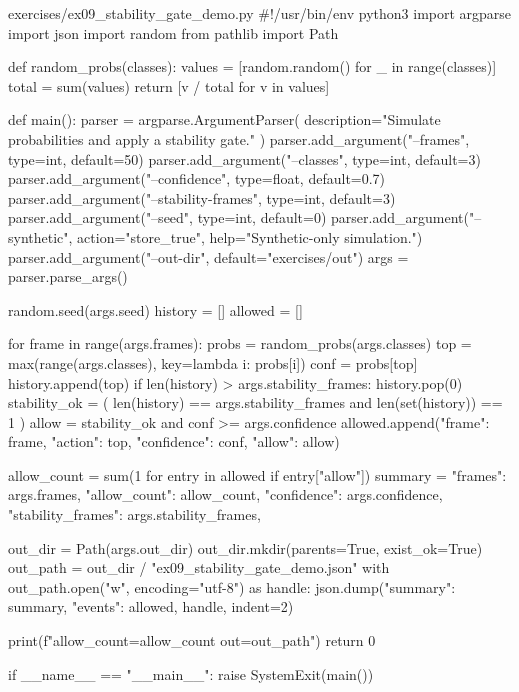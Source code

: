 \documentclass[11pt,openany]{book}
\begin{document}
\begin{filecontents*}{exercises/ex09_stability_gate_demo.py}
#!/usr/bin/env python3
import argparse
import json
import random
from pathlib import Path


def random_probs(classes):
    values = [random.random() for _ in range(classes)]
    total = sum(values)
    return [v / total for v in values]


def main():
    parser = argparse.ArgumentParser(
        description="Simulate probabilities and apply a stability gate."
    )
    parser.add_argument("--frames", type=int, default=50)
    parser.add_argument("--classes", type=int, default=3)
    parser.add_argument("--confidence", type=float, default=0.7)
    parser.add_argument("--stability-frames", type=int, default=3)
    parser.add_argument("--seed", type=int, default=0)
    parser.add_argument("--synthetic", action="store_true", help="Synthetic-only simulation.")
    parser.add_argument("--out-dir", default="exercises/out")
    args = parser.parse_args()

    random.seed(args.seed)
    history = []
    allowed = []

    for frame in range(args.frames):
        probs = random_probs(args.classes)
        top = max(range(args.classes), key=lambda i: probs[i])
        conf = probs[top]
        history.append(top)
        if len(history) > args.stability_frames:
            history.pop(0)
        stability_ok = (
            len(history) == args.stability_frames and len(set(history)) == 1
        )
        allow = stability_ok and conf >= args.confidence
        allowed.append({"frame": frame, "action": top, "confidence": conf, "allow": allow})

    allow_count = sum(1 for entry in allowed if entry["allow"])
    summary = {
        "frames": args.frames,
        "allow_count": allow_count,
        "confidence": args.confidence,
        "stability_frames": args.stability_frames,
    }

    out_dir = Path(args.out_dir)
    out_dir.mkdir(parents=True, exist_ok=True)
    out_path = out_dir / "ex09_stability_gate_demo.json"
    with out_path.open("w", encoding="utf-8") as handle:
        json.dump({"summary": summary, "events": allowed}, handle, indent=2)

    print(f"allow_count={allow_count} out={out_path}")
    return 0


if __name__ == "__main__":
    raise SystemExit(main())
\end{filecontents*}
\end{document}
